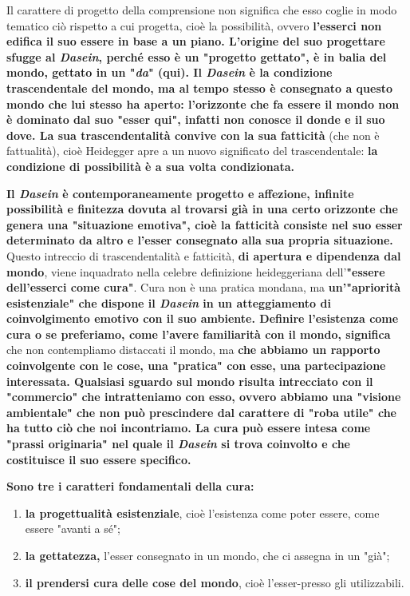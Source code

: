 Il carattere di progetto della comprensione non
significa che esso coglie in modo tematico ciò
rispetto a cui progetta, cioè la possibilità, ovvero
\textbf{l'esserci non edifica il suo essere in base a un
piano. L'origine del suo progettare sfugge al \textit{Dasein},
perché esso è un "progetto gettato", è in balia
del mondo, gettato in un "\textit{da}" (qui).
Il \textit{Dasein} è la condizione trascendentale del mondo,
ma al tempo stesso è consegnato a questo mondo
che lui stesso ha aperto: l'orizzonte che fa essere
il mondo non è dominato dal suo "esser qui", infatti
non conosce il donde e il suo dove. La sua
trascendentalità convive con la sua fatticità} (che non
è fattualità), cioè Heidegger apre a un nuovo
significato del trascendentale: \textbf{la condizione di
possibilità è a sua volta condizionata.}

\textbf{Il \textit{Dasein} è contemporaneamente progetto e affezione,
infinite possibilità  e finitezza dovuta al
trovarsi già in una certo orizzonte che genera una
"situazione emotiva", cioè la fatticità consiste
nel suo esser determinato da altro e l'esser
consegnato alla sua propria situazione.}
Questo intreccio di trascendentalità e fatticità,
\textbf{di apertura e dipendenza dal mondo}, viene inquadrato
nella celebre definizione heideggeriana dell'\textbf{"essere
dell'esserci come cura"}. Cura non è una
pratica mondana, ma \textbf{un'"apriorità esistenziale"
che dispone il \textit{Dasein} in un atteggiamento di
coinvolgimento emotivo con il suo ambiente.
Definire l'esistenza come cura o se preferiamo, come l'avere familiarità con il mondo, significa} che
non contempliamo distaccati il mondo, ma \textbf{che
abbiamo un rapporto coinvolgente con le cose, una
"pratica" con esse, una partecipazione interessata.
Qualsiasi sguardo sul mondo risulta intrecciato con
il "commercio" che intratteniamo con esso, ovvero abbiamo
una "visione ambientale" che non può prescindere
dal carattere di "roba utile" che ha tutto ciò
che noi incontriamo. La cura può essere intesa
come "prassi originaria" nel quale il \textit{Dasein} si
trova coinvolto e che costituisce il suo essere
specifico.}

\textbf{Sono tre i caratteri fondamentali della cura:}
\begin{enumerate}
	\item \textbf{la progettualità esistenziale}, cioè l'esistenza
	come poter essere, come essere "avanti a sé";
	\item \textbf{la gettatezza,} l'esser consegnato in un mondo,
	che ci assegna in un "già";
	\item \textbf{il prendersi cura delle cose del mondo}, cioè
	l'esser-presso gli utilizzabili.
\end{enumerate}

